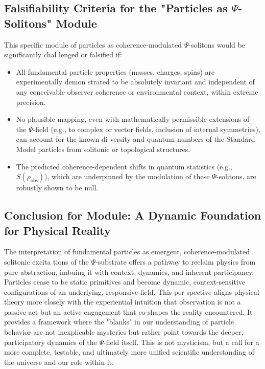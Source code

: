 \documentclass{report}
\begin{document}
    \subsection{Falsifiability Criteria for the "Particles as $\Psi$-Solitons" Module}
    \label{subsec:falsifiability_psi_solitons_module}
    This specific module of particles as coherence-modulated $\Psi$-solitons would be significantly chal lenged or falsified if:
    \begin{itemize}
        \item All fundamental particle properties (masses, charges, spins) are experimentally demon strated to be absolutely invariant and independent of any conceivable observer coherence or environmental context, within extreme precision.
        \item No plausible mapping, even with mathematically permissible extensions of the $\Psi$-field (e.g., to complex or vector fields, inclusion of internal symmetries), can account for the known di versity and quantum numbers of the Standard Model particles from solitonic or topological structures.
        \item The predicted coherence-dependent shifts in quantum statistics (e.g., $S(\rho_{\text{obs}})$), which are underpinned by the modulation of these $\Psi$-solitons, are robustly shown to be null.
    \end{itemize}

    \subsection{Conclusion for Module: A Dynamic Foundation for Physical Reality}
    \label{subsec:conclusion_dynamic_foundation}
    The interpretation of fundamental particles as emergent, coherence-modulated solitonic excita tions of the $\Psi$-substrate offers a pathway to reclaim physics from pure abstraction, imbuing it
    with context, dynamics, and inherent participancy. Particles cease to be static primitives and
    become dynamic, context-sensitive configurations of an underlying, responsive field. This per spective aligns physical theory more closely with the experiential intuition that observation is
    not a passive act but an active engagement that co-shapes the reality encountered. It provides
    a framework where the "blanks" in our understanding of particle behavior are not inexplicable
    mysteries but rather point towards the deeper, participatory dynamics of the $\Psi$-field itself. This
    is not mysticism, but a call for a more complete, testable, and ultimately more unified scientific
    understanding of the universe and our role within it.
\end{document}
